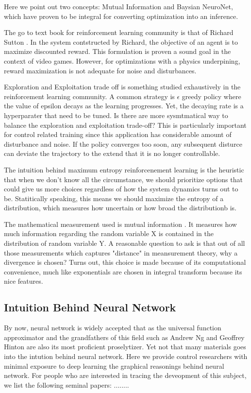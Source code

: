 \documentclass[journal]{IEEEtran}
\begin{document}
Here we point out two concepts: Mutual Information and Baysian NeuroNet, which have proven to be integral for converting optimization into an inference.

The go to text book for reinforcement learning community is that of Richard Sutton \cite{Sutton1998IntroductionTR}. In the system contstructed by Richard, the objective of an agent is to maximize discounted reward. This formulation is proven a sound goal in the context of video games. However, for optimizations with a physics underpining, reward maximization is not adequate for noise and disturbances.

Exploration and Exploitation trade off is something studied exhaustively in the reinforcement learning community. A common strategy is $\epsilon$ greedy policy where the value of epsilon decays as the learning progresses. Yet, the decaying rate is a hyperparater that need to be tuned. Is there are more sysmtmatical way to balance the exploration and exploitation trade-off? This is particularly important for control related training since this application has considerable amount of disturbance and noise. If the policy converges too soon, any subsequent disturce can deviate the trajectory to the extend that it is no longer controllable.

The intuition behind maximum entropy reinforcenement learning is the heuristic that when we don't know all the circumstance, we should prioritize options that could give us more choices regardless of how the system dynamics turns out to be. Statitically speaking, this means we should maximize the entropy of a distribution, which measures how uncertain or how broad the distributionb is.

The mathematical measurement used is mutual information \cite{Kullback1951ONIA}. It measures how much information regarding the random variable X is contained in the distribution of random variable Y. A reasonable question to ask is that out of all those measurements which captures "distance" in meansurement theory, why a divergence is chosen? Turns out, this choice is made because of its computational convenience, much like exponentials are chosen in integral transform because its nice features.

\subsection{Intuition Behind Neural Network}
By now, neural network is widely accepted that as the universal function approximator \cite{Hornik1991ApproximationCO} and the grandfathers of this field such as Andrew Ng and Geoffrey Hinton are also its most proficient proselytizer. Yet not that many materials goes into the intution behind neural network. Here we provide control researchers with minimal exposure to deep learning the graphical reasonings behind neural network. For people who are interested in tracing the deveopment of this subject, we list the following seminal papers: \cite{Schwartz1989TheNC} \cite{Hornik1989MultilayerFN}........
\end{document}
